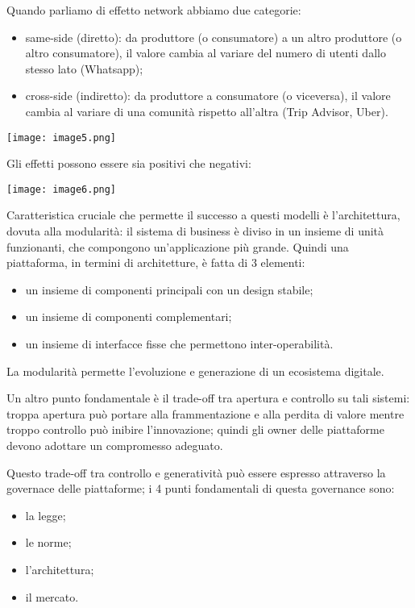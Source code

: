 \documentclass[a4page, 11pt]{article}
\begin{document}
Quando parliamo di effetto network abbiamo due categorie:
\begin{itemize}
  \item same-side (diretto): da produttore (o consumatore) a un altro produttore (o altro consumatore), il valore cambia al variare del numero di utenti dallo stesso lato (Whatsapp);
  \item cross-side (indiretto): da produttore a consumatore (o viceversa), il valore cambia al variare di una comunità rispetto all'altra (Trip Advisor, Uber).
\end{itemize}
\begin{center}
	\texttt{[image: image5.png]}
\end{center}
Gli effetti possono essere sia positivi che negativi:
\begin{center}
	\texttt{[image: image6.png]}
\end{center}

Caratteristica cruciale che permette il successo a questi modelli è l'architettura, dovuta alla modularità: il sistema di business è diviso in un insieme di unità funzionanti, che compongono un'applicazione più grande.
Quindi una piattaforma, in termini di architetture, è fatta di 3 elementi:
\begin{itemize}[noitemsep]
  \item un insieme di componenti principali con un design stabile;
  \item un insieme di componenti complementari;
  \item un insieme di interfacce fisse che permettono inter-operabilità.
\end{itemize}
La modularità permette l'evoluzione e generazione di un ecosistema digitale.

Un altro punto fondamentale è il trade-off tra apertura e controllo su tali sistemi: troppa apertura può portare alla frammentazione e alla perdita di valore mentre troppo controllo può inibire l'innovazione; quindi gli owner delle piattaforme devono adottare un compromesso adeguato.

Questo trade-off tra controllo e generatività può essere espresso attraverso la governace delle piattaforme; i 4 punti fondamentali di questa governance sono:
\begin{itemize}[noitemsep]
  \item la legge;
  \item le norme;
  \item l'architettura;
  \item il mercato.
\end{itemize}
\end{document}
